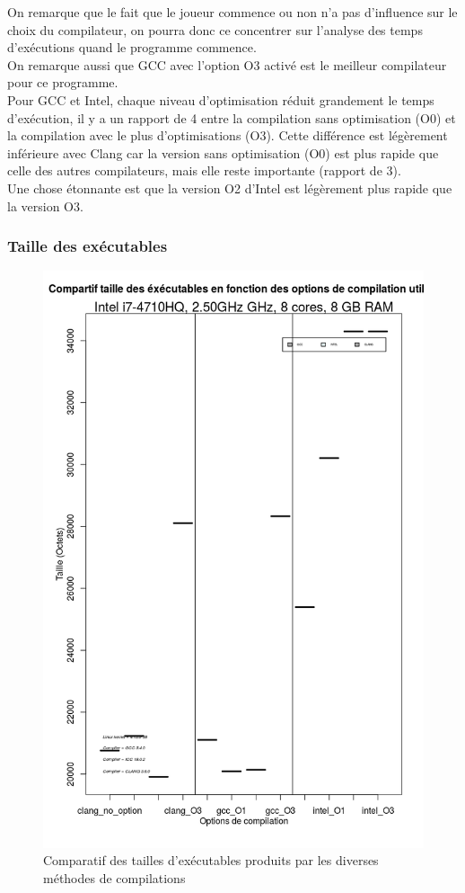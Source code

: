 \documentclass[
 aip,
 jmp,
 amsmath,amssymb,
 reprint
]{revtex4-1}
\begin{document}
On remarque que le fait que le joueur commence ou non n'a pas d'influence sur le choix du compilateur, on pourra donc ce concentrer sur l'analyse des temps d'exécutions quand le programme commence.\\
On remarque aussi que GCC avec l'option O3 activé est le meilleur compilateur pour ce programme.\\
Pour GCC et Intel, chaque niveau d'optimisation réduit grandement le temps d'exécution, il y a un rapport de 4 entre la compilation sans optimisation (O0) et la compilation avec le plus d'optimisations (O3). Cette différence est légèrement inférieure avec Clang car la version sans optimisation (O0) est plus rapide que celle des autres compilateurs, mais elle reste importante (rapport de 3).\\
Une chose étonnante est que la version O2 d'Intel est légèrement plus rapide que la version O3.\\

\subsubsection{Taille des exécutables}
\begin{figure}[H]
  \includegraphics[width=\linewidth, keepaspectratio=true]{sizes.png}
  \caption{Comparatif des tailles d'exécutables produits par les diverses méthodes de compilations\label{Fig:taille_executables_seq}}
\end{figure}
\end{document}
